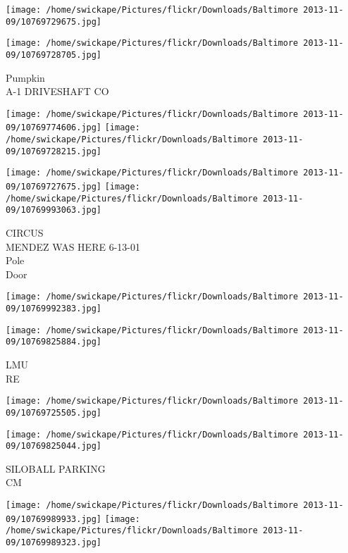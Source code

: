 \documentclass[10pt,letterpaper]{article}
\begin{document}
\texttt{[image: /home/swickape/Pictures/flickr/Downloads/Baltimore 2013-11-09/10769729675.jpg]}

\vspace{0.25in}
\texttt{[image: /home/swickape/Pictures/flickr/Downloads/Baltimore 2013-11-09/10769728705.jpg]}

Pumpkin\\
A{-}1 DRIVESHAFT CO\\
\pagebreak

\texttt{[image: /home/swickape/Pictures/flickr/Downloads/Baltimore 2013-11-09/10769774606.jpg]}
\texttt{[image: /home/swickape/Pictures/flickr/Downloads/Baltimore 2013-11-09/10769728215.jpg]}

\texttt{[image: /home/swickape/Pictures/flickr/Downloads/Baltimore 2013-11-09/10769727675.jpg]}
\texttt{[image: /home/swickape/Pictures/flickr/Downloads/Baltimore 2013-11-09/10769993063.jpg]}

CIRCUS\\
MENDEZ WAS HERE 6{-}13{-}01\\
Pole\\
Door\\
\pagebreak

\texttt{[image: /home/swickape/Pictures/flickr/Downloads/Baltimore 2013-11-09/10769992383.jpg]}

\vspace{0.25in}
\texttt{[image: /home/swickape/Pictures/flickr/Downloads/Baltimore 2013-11-09/10769825884.jpg]}

LMU\\
RE\\
\pagebreak

\texttt{[image: /home/swickape/Pictures/flickr/Downloads/Baltimore 2013-11-09/10769725505.jpg]}

\vspace{0.25in}
\texttt{[image: /home/swickape/Pictures/flickr/Downloads/Baltimore 2013-11-09/10769825044.jpg]}

SILOBALL PARKING\\
CM\\
\pagebreak

\texttt{[image: /home/swickape/Pictures/flickr/Downloads/Baltimore 2013-11-09/10769989933.jpg]}
\texttt{[image: /home/swickape/Pictures/flickr/Downloads/Baltimore 2013-11-09/10769989323.jpg]}
\end{document}
